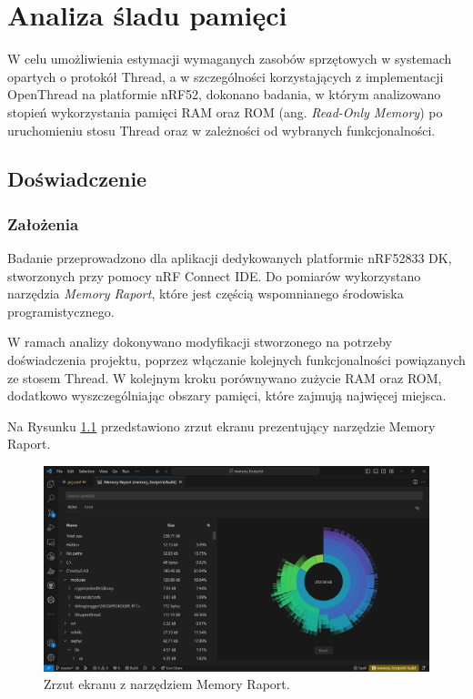 \chapter{Analiza śladu pamięci}

W celu umożliwienia estymacji wymaganych zasobów sprzętowych w systemach opartych o protokół Thread, a w szczególności korzystających z implementacji OpenThread na platformie nRF52, dokonano badania, w którym analizowano stopień wykorzystania pamięci RAM oraz ROM (ang. \textit{Read-Only Memory}) po uruchomieniu stosu Thread oraz w zależności od wybranych funkcjonalności.

\section{Doświadczenie}

    \subsection{Założenia}

    Badanie przeprowadzono dla aplikacji dedykowanych platformie nRF52833 DK, stworzonych przy pomocy nRF Connect IDE. Do pomiarów wykorzystano narzędzia \textit{Memory Raport}, które jest częścią wspomnianego środowiska programistycznego. 
    
    W ramach analizy dokonywano modyfikacji stworzonego na potrzeby doświadczenia projektu, poprzez włączanie kolejnych funkcjonalności powiązanych ze stosem Thread. W kolejnym kroku porównywano zużycie RAM oraz ROM, dodatkowo wyszczególniając obszary pamięci, które zajmują najwięcej miejsca.

    Na Rysunku \ref{fig:memory-raport} przedstawiono zrzut ekranu prezentujący narzędzie Memory Raport.

    \begin{figure}[H]
        \centering
        \includegraphics[width=0.8\linewidth]{graphics/memory-raport.png}
        \caption{Zrzut ekranu z narzędziem Memory Raport.}
        \label{fig:memory-raport}
    \end{figure}

